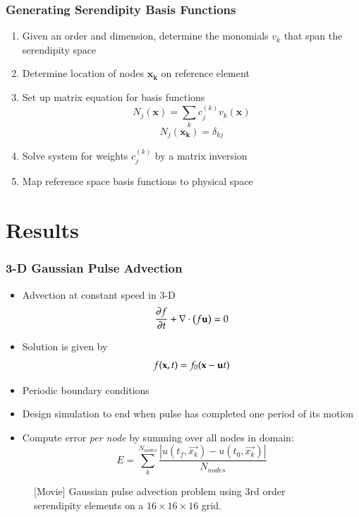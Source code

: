 \documentclass[serif,12pt]{beamer}
\begin{document}
\begin{frame}
\frametitle{Generating Serendipity Basis Functions}
	\begin{enumerate}
		\item Given an order and dimension, determine the monomials $v_k$ that span the serendipity space
		\item Determine location of nodes $\mathbf{x_k}$ on reference element
		\item Set up matrix equation for basis functions
		\[N_j (\mathbf{x}) = \displaystyle\sum\limits_{k} c_j^{(k)}v_k(\mathbf{x}) \]
		\[N_j (\mathbf{x_k}) = \delta_{kj} \]
		\item Solve system for weights $c_j^{(k)}$ by a matrix inversion
		\item Map reference space basis functions to physical space
	\end{enumerate}
\end{frame}

\section{Results}

\begin{frame}
\frametitle{3-D Gaussian Pulse Advection}
\begin{itemize}
	\item Advection at constant speed in 3-D \[\frac{\partial f}{\partial t} +\nabla\cdot\left( f {\bold u}\right) = 0\]
	\item Solution is given by \[f({\bold x},t) = f_0({\bold x}-{\bold u}t)\]
	\item Periodic boundary conditions
	\item Design simulation to end when pulse has completed one period of its motion
	\item Compute error \emph{per node} by summing over all nodes in domain: \[E = \displaystyle\sum\limits_{k}^{N_{nodes}}\frac{|u(t_f,\vec{x_k})-u(t_0,\vec{x_k})|}{N_{nodes}}\]
\end{itemize}
\end{frame}

\begin{frame}
  \begin{figure}
    \caption{[Movie] Gaussian pulse advection problem using 3rd order serendipity elements on a $16\times 16\times 16$ grid.}
  \end{figure}
\end{frame}
\end{document}
